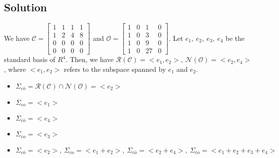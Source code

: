 \documentclass[11pt]{report}
\newcommand{\mc}{\mathcal}
\begin{document}
\subsection*{Solution}
We have $\mc{C} = \begin{bmatrix}1 & 1 & 1 & 1\\ 1 & 2 & 4 & 8\\ 0 & 0 & 0 & 0\\ 0 & 0 & 0 & 0\end{bmatrix}$ and $\mc{O} = \begin{bmatrix}1 & 0 & 1 & 0\\ 1 & 0 & 3 & 0\\ 1 & 0 & 9 & 0\\ 1 & 0 & 27 & 0\end{bmatrix}$. Let $e_1,~e_2,~e_3,~e_4$ be the standard basis of $R^4$. Then, we have $\mc{R}(\mc{C}) = <e_1, e_2>,~\mc{N}(\mc{O}) = <e_2, e_4>$, where $<e_1, e_2>$ refers to the subspace spanned by $e_1$ and $e_2$.
\begin{itemize}
\item $\Sigma_{c \bar o} = \mc{R}(\mc{C}) \cap \mc{N}(\mc{O}) = <e_2>$
\item $\Sigma_{c o} = <e_1>$
\item $\Sigma_{\bar c \bar o} = <e_4>$
\item $\Sigma_{\bar c o} = <e_3>$
\item $\Sigma_{c \bar o} = <e_2>,~\Sigma_{c o} = <e_1+e_2>,~\Sigma_{\bar c \bar o} = <e_2+e_4>,~\Sigma_{\bar c o} = <e_1+e_2+e_3+e_4>$
\end{itemize}

\end{document}
